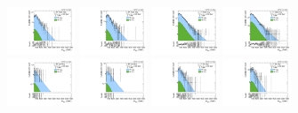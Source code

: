 \begin{figure}[htbp]
  \includegraphics[width=0.18\textwidth]{fig/fitValidation/PostFit_SR_MVV_MJJ110to150__mu_HP_nobb_HDy_Run2.pdf}
  \includegraphics[width=0.18\textwidth]{fig/fitValidation/PostFit_SR_MVV_MJJ110to150__e_HP_nobb_HDy_Run2.pdf}
  \includegraphics[width=0.18\textwidth]{fig/fitValidation/PostFit_SR_MVV_MJJ110to150__mu_LP_nobb_HDy_Run2.pdf}
  \includegraphics[width=0.18\textwidth]{fig/fitValidation/PostFit_SR_MVV_MJJ110to150__e_LP_nobb_HDy_Run2.pdf}\\
  \includegraphics[width=0.18\textwidth]{fig/fitValidation/PostFit_SR_MVV_MJJ110to150__mu_HP_vbf_HDy_Run2.pdf}
  \includegraphics[width=0.18\textwidth]{fig/fitValidation/PostFit_SR_MVV_MJJ110to150__e_HP_vbf_HDy_Run2.pdf}
  \includegraphics[width=0.18\textwidth]{fig/fitValidation/PostFit_SR_MVV_MJJ110to150__mu_LP_vbf_HDy_Run2.pdf}
  \includegraphics[width=0.18\textwidth]{fig/fitValidation/PostFit_SR_MVV_MJJ110to150__e_LP_vbf_HDy_Run2.pdf}\\
  \caption{
  }
  \label{fig:postfit_MVV_MJJ110to150_Run2}
\end{figure}


